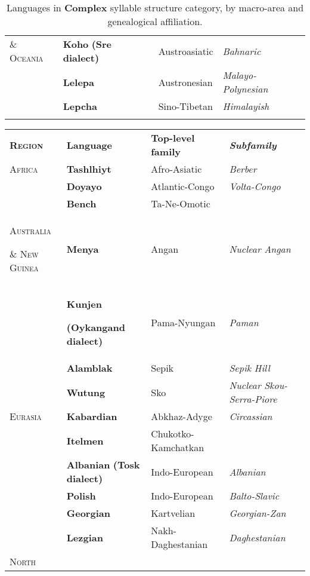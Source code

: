 \begin{table}
\begin{tabularx}{\textwidth}{XXXX}
\textsc{\&} \textsc{Oceania} & \textbf{Koho} \textbf{(Sre} \textbf{dialect)} & Austroasiatic & \textit{Bahnaric}\\
\hhline{-~~~} & \textbf{Lelepa} & Austronesian & \textit{Malayo-Polynesian}\\
& \textbf{Lepcha} & Sino-Tibetan & \textit{Himalayish}\\
\hhline{~---}
\lspbottomrule
\end{tabularx}
\caption{\label{2.6}Languages in \textbf{Complex} syllable structure category, by macro-area and genealogical affiliation.}
\end{table}




\begin{table}
\begin{tabularx}{\textwidth}{XXXX}
\lsptoprule

\textbf{\textsc{Region}} & \textbf{Language} & \textbf{Top-level} \textbf{family} & \textbf{\textit{Subfamily}}\\
\textsc{Africa} & \textbf{Tashlhiyt} & Afro-Asiatic & \textit{Berber}\\
\hhline{-~~~} & \textbf{Doyayo} & Atlantic-Congo & \textit{Volta-Congo}\\
& \textbf{Bench} & Ta-Ne-Omotic & \\
\textsc{Australia} 

\textsc{\&} \textsc{New} \textsc{Guinea} & \textbf{Menya} & Angan & \textit{Nuclear} \textit{Angan}\\
\hhline{-~~~} & \textbf{Kunjen} 

\textbf{(Oykangand} \textbf{dialect)} & Pama-Nyungan & \textit{Paman}\\
& \textbf{Alamblak} & Sepik & \textit{Sepik} \textit{Hill}\\
& \textbf{Wutung} & Sko & \textit{Nuclear} \textit{Skou-Serra-Piore}\\
\textsc{Eurasia} & \textbf{Kabardian} & Abkhaz-Adyge & \textit{Circassian}\\
\hhline{-~~~} & \textbf{Itelmen} & Chukotko-Kamchatkan & \\
& \textbf{Albanian} \textbf{(Tosk} \textbf{dialect)} & Indo-European & \textit{Albanian}\\
& \textbf{Polish} & Indo-European & \textit{Balto-Slavic}\\
& \textbf{Georgian} & Kartvelian & \textit{Georgian-Zan}\\
& \textbf{Lezgian} & Nakh-Daghestanian & \textit{Daghestanian}\\
\textsc{North} 


\end{tabularx}
\end{table}
